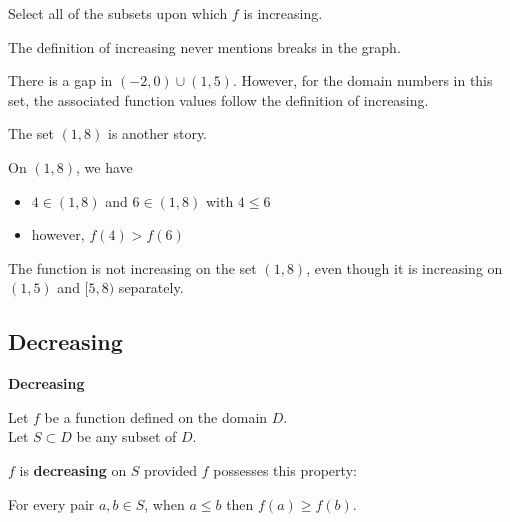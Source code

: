 \documentclass{ximera}
\begin{document}
\begin{example}
\begin{question} 


Select all of the subsets upon which $f$ is increasing.


\begin{selectAll}
\end{selectAll}
\end{question}





\end{example}
The definition of increasing never mentions breaks in the graph. 

There is a gap in $(-2,0) \cup (1,5)$.  However, for the domain numbers in this set, the associated function values follow the definition of increasing.   

The set $(1,8)$ is another story.


On $(1,8)$, we have 

\begin{itemize}
\item $4 \in (1,8)$  and  $6 \in (1,8)$  with $4 \leq 6$ 

\item however, $f(4) > f(6)$
\end{itemize}


The function is not increasing on the set $(1,8)$, even though it is increasing on $(1,5)$ and $[5,8)$ separately. 












\newpage

\subsection*{Decreasing}



\begin{definition} \textbf{\textcolor{green!50!black}{Decreasing}} 


Let $f$ be a function defined on the domain $D$. \\
Let $S \subset D$ be any subset of $D$.

$f$ is \textbf{decreasing} on $S$ provided $f$ possesses this property:  


\begin{center}
For every pair $a, b \in S$, when $a \leq b$ then $f(a) \geq f(b)$.
\end{center}

\end{definition}
\end{document}
